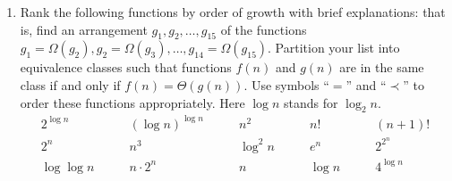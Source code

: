 \documentclass[12pt,a4paper,UTF8]{article}
\theoremstyle{definition}
\begin{document}
\begin{enumerate}
    \item

    Rank the following functions by order of growth with brief explanations: that is, find an arrangement $g_1, g_2, \ldots , g_{15}$ of the functions $g_1 = \Omega(g_2), g_2 = \Omega(g_3), \ldots, g_{14} = \Omega(g_{15})$.  Partition your list into equivalence classes such that functions $f(n)$ and $g(n)$ are in the same class if and only if $f(n) = \Theta(g(n))$. Use symbols ``$=$'' and ``$\prec$'' to order these functions appropriately. Here $\log n$ stands for $\log_2 n$.
    $$
    \begin{array}{ccccc}
        2^{\log n} \quad & \quad (\log n)^{\log n} \quad & \quad n^2 \quad & \quad n! \quad & \quad (n + 1)! \\
        2^n \quad & \quad n^3 \quad & \quad \log^2 n \quad & \quad e^n \quad & \quad 2^{2^n} \\
        \log\log n \quad & \quad n\cdot 2^n \quad & \quad n \quad & \quad \log n \quad & \quad 4^{\log n} \\
    \end{array}
    $$


\end{enumerate}
\end{document}
